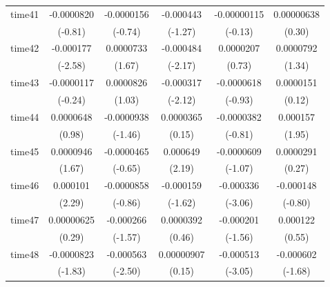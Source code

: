 \begin{table}[htbp]
\begin{tabular}{l*{5}{c}}
time41      &  -0.0000820         &  -0.0000156         &   -0.000443         & -0.00000115         &  0.00000638         \\
            &     (-0.81)         &     (-0.74)         &     (-1.27)         &     (-0.13)         &      (0.30)         \\
time42      &   -0.000177\sym{**} &   0.0000733         &   -0.000484\sym{*}  &   0.0000207         &   0.0000792         \\
            &     (-2.58)         &      (1.67)         &     (-2.17)         &      (0.73)         &      (1.34)         \\
time43      &  -0.0000117         &   0.0000826         &   -0.000317\sym{*}  &  -0.0000618         &   0.0000151         \\
            &     (-0.24)         &      (1.03)         &     (-2.12)         &     (-0.93)         &      (0.12)         \\
time44      &   0.0000648         &  -0.0000938         &   0.0000365         &  -0.0000382         &    0.000157         \\
            &      (0.98)         &     (-1.46)         &      (0.15)         &     (-0.81)         &      (1.95)         \\
time45      &   0.0000946         &  -0.0000465         &    0.000649\sym{*}  &  -0.0000609         &   0.0000291         \\
            &      (1.67)         &     (-0.65)         &      (2.19)         &     (-1.07)         &      (0.27)         \\
time46      &    0.000101\sym{*}  &  -0.0000858         &   -0.000159         &   -0.000336\sym{**} &   -0.000148         \\
            &      (2.29)         &     (-0.86)         &     (-1.62)         &     (-3.06)         &     (-0.80)         \\
time47      &  0.00000625         &   -0.000266         &   0.0000392         &   -0.000201         &    0.000122         \\
            &      (0.29)         &     (-1.57)         &      (0.46)         &     (-1.56)         &      (0.55)         \\
time48      &  -0.0000823         &   -0.000563\sym{*}  &  0.00000907         &   -0.000513\sym{**} &   -0.000602         \\
            &     (-1.83)         &     (-2.50)         &      (0.15)         &     (-3.05)         &     (-1.68)         \\

\end{tabular}
\end{table}
